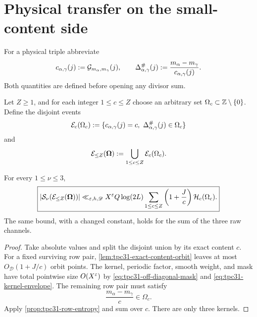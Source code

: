 \section{Physical transfer on the small-content side}
\label{sec:tpc31-small-transfer}

For a physical triple abbreviate
\begin{equation}
 c_{\alpha,\gamma}(j)
 :=\mathcal G_{m_\alpha,m_\gamma}(j),
 \qquad
 \Delta^\#_{\alpha,\gamma}(j)
 :=\frac{m_\alpha-m_\gamma}{c_{\alpha,\gamma}(j)}.
 \label{eq:tpc31-physical-c-delta}
\end{equation}
Both quantities are defined before opening any divisor sum.

Let $Z\ge1$, and for each integer $1\le c\le Z$ choose an arbitrary
set $\Omega_c\subset\mathbb Z\setminus\{0\}$.  Define the disjoint events
\begin{equation}
 \mathcal E_c(\Omega_c)
 :=\{c_{\alpha,\gamma}(j)=c,
       \ \Delta^\#_{\alpha,\gamma}(j)\in\Omega_c\}
 \label{eq:tpc31-exact-cell-event}
\end{equation}
and
\begin{equation}
 \mathcal E_{\le Z}(\boldsymbol\Omega)
 :=\bigcup_{1\le c\le Z}\mathcal E_c(\Omega_c).
 \label{eq:tpc31-small-cell-union}
\end{equation}

\begin{theorem}
\label{thm:tpc31-small-content-transfer}
For every $1\le\nu\le3$,
\begin{equation}
 \boxed{
 |\mathcal S_\nu(\mathcal E_{\le Z}(\boldsymbol\Omega))|
 \ll_{\varepsilon,h,\mathscr D}
 X^\varepsilon Q\log(2L)
 \sum_{1\le c\le Z}
 \left(1+\frac Jc\right)\mathcal H_c(\Omega_c).}
 \label{eq:tpc31-small-content-transfer}
\end{equation}
The same bound, with a changed constant, holds for the sum of the
three raw channels.
\end{theorem}

\begin{proof}
Take absolute values and split the disjoint union by its exact content
$c$.  For a fixed surviving row pair,
\cref{lem:tpc31-exact-content-orbit} leaves at most
$O_{\mathscr D}(1+J/c)$ orbit points.  The kernel, periodic factor,
smooth weight, and mask have total pointwise size $O(X^\varepsilon)$ by
\eqref{eq:tpc31-off-diagonal-mask} and
\eqref{eq:tpc31-kernel-envelope}.  The remaining row pair must satisfy
\[
 \frac{m_\alpha-m_\gamma}{c}\in\Omega_c.
\]
Apply \cref{prop:tpc31-row-entropy} and sum over $c$.  There are only
three kernels.
\end{proof}

